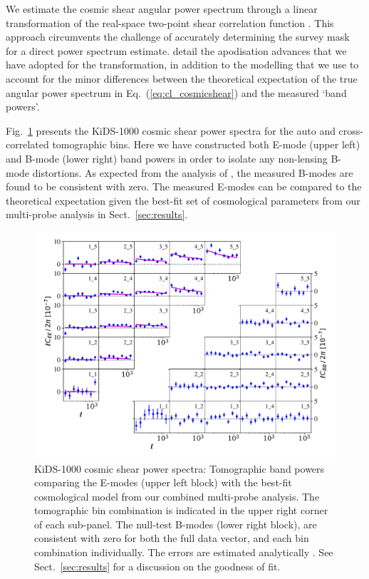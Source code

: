 We estimate the cosmic shear angular power spectrum through a linear transformation of the real-space two-point shear correlation function \citep{schneider/etal:2002}.  This approach circumvents the challenge of accurately determining the survey mask for a direct power spectrum estimate.  \citet{joachimi/etal:inprep} detail the apodisation advances that we have adopted for the transformation, in addition to the modelling that we use to account for the minor differences between the theoretical expectation of the true angular power spectrum in Eq.~(\ref{eq:cl_cosmicshear}) and the measured `band powers'.    
 
Fig.~\ref{fig:Pkk} presents the \citet{asgari/etal:inprep} KiDS-1000 cosmic shear power spectra for the auto and cross-correlated tomographic bins.   Here we have constructed both E-mode (upper left) and B-mode (lower right) band powers in order to isolate any non-lensing B-mode distortions.     As expected from the analysis of \citet{giblin/etal:inprep}, the measured B-modes are found to be consistent with zero.   The measured E-modes can be compared to the theoretical expectation given the best-fit set of cosmological parameters from our multi-probe analysis in Sect.~\ref{sec:results}.



\begin{figure}
        \includegraphics[width=\textwidth]{Data_Plots/Pkk/Pkk_K1000_2Dbins_v2_goldclasses_Flag_SOM_Fid_A.pdf}
        \caption{KiDS-1000 cosmic shear power spectra:  Tomographic
          band powers comparing the E-modes (upper left block) with the best-fit
          cosmological model from our combined multi-probe analysis.  The tomographic
        bin combination is indicated in the upper right corner of each
      sub-panel.  The null-test B-modes (lower right block), are
      consistent with zero for both the full data vector, and each
     bin combination individually.   The errors are estimated analytically \citep{joachimi/etal:inprep}.  See Sect.~\ref{sec:results} for a discussion on the goodness of fit.}
        \label{fig:Pkk}
\end{figure}


